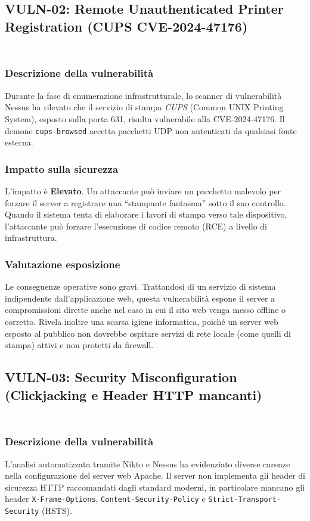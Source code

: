 \documentclass[11pt]{article}
\newcommand{\sev}[2]{%
  \setlength{\fboxsep}{3pt}%
  \colorbox{#1}{\textcolor{white}{\small\textbf{#2}}}%
}
\newcommand{\sevHIGH}{\sev{sevElevato}{ELEVATO}}
\newcommand{\sevMED}{\sev{sevMedio}{MEDIO}}
\begin{document}
\subsection{VULN-02: Remote Unauthenticated Printer Registration (CUPS CVE-2024-47176) \hfill \sevHIGH}
\subsubsection{Descrizione della vulnerabilità}
Durante la fase di enumerazione infrastrutturale, lo scanner di vulnerabilità Nessus ha rilevato che il servizio di stampa \textit{CUPS} (Common UNIX Printing System), esposto sulla porta 631, risulta vulnerabile alla CVE-2024-47176. Il demone \texttt{cups-browsed} accetta pacchetti UDP non autenticati da qualsiasi fonte esterna.

\subsubsection{Impatto sulla sicurezza}
L'impatto è \textbf{Elevato}. Un attaccante può inviare un pacchetto malevolo per forzare il server a registrare una ``stampante fantasma'' sotto il suo controllo. Quando il sistema tenta di elaborare i lavori di stampa verso tale dispositivo, l'attaccante può forzare l'esecuzione di codice remoto (RCE) a livello di infrastruttura.

\subsubsection{Valutazione esposizione}
Le conseguenze operative sono gravi. Trattandosi di un servizio di sistema indipendente dall'applicazione web, questa vulnerabilità espone il server a compromissioni dirette anche nel caso in cui il sito web venga messo offline o corretto. Rivela inoltre una scarsa igiene informatica, poiché un server web esposto al pubblico non dovrebbe ospitare servizi di rete locale (come quelli di stampa) attivi e non protetti da firewall.

\subsection{VULN-03: Security Misconfiguration (Clickjacking e Header HTTP mancanti) \hfill \sevMED}
\subsubsection{Descrizione della vulnerabilità}
L'analisi automatizzata tramite Nikto e Nessus ha evidenziato diverse carenze nella configurazione del server web Apache. Il server non implementa gli header di sicurezza HTTP raccomandati dagli standard moderni, in particolare mancano gli header \texttt{X-Frame-Options}, \texttt{Content-Security-Policy} e \texttt{Strict-Transport-Security} (HSTS).
\end{document}
